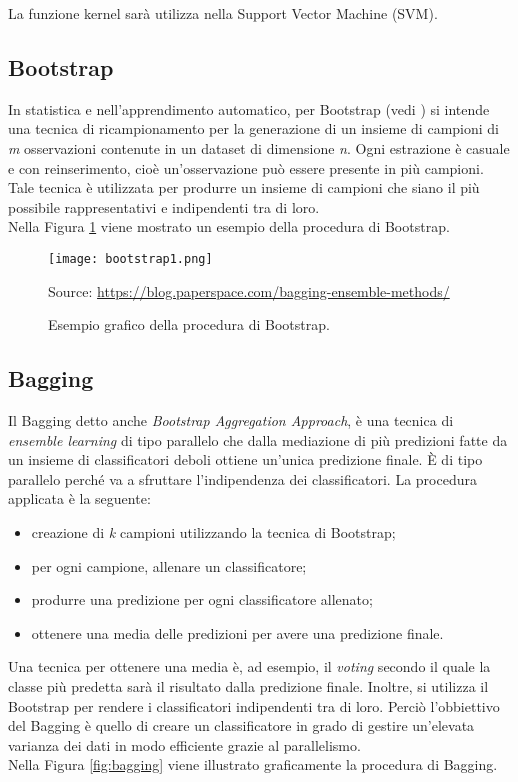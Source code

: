 La funzione kernel sarà utilizza nella Support Vector Machine (SVM).

\subsection{Bootstrap}
In statistica e nell'apprendimento automatico, per Bootstrap (vedi \textit{\cite{bootstrap}}) si intende una tecnica di ricampionamento per la generazione di un insieme di campioni di \emph{m} osservazioni contenute in un dataset di dimensione \emph{n}. Ogni estrazione è casuale e con reinserimento, cioè un’osservazione può essere presente in più campioni. Tale tecnica è utilizzata per produrre un insieme di campioni che siano il più possibile rappresentativi e indipendenti tra di loro.\\
Nella Figura \ref{fig:bootstrap} viene mostrato un esempio della procedura di Bootstrap.

\begin{figure}[h]
	\begin{center}
		\texttt{[image: bootstrap1.png]}
		\caption{Esempio grafico della procedura di Bootstrap.
		} 
		Source: \url{https://blog.paperspace.com/bagging-ensemble-methods/}\label{fig:bootstrap}
	\end{center}
\end{figure}

\subsection{Bagging}
Il Bagging \autocite{breiman1996bagging} detto anche \emph{Bootstrap Aggregation Approach}, è una tecnica di \emph{ensemble learning} di tipo parallelo che dalla mediazione di più predizioni fatte da un insieme di classificatori deboli ottiene un'unica predizione finale. È di tipo parallelo perché va a sfruttare l'indipendenza dei classificatori. La procedura applicata è la seguente:
\begin{itemize}
	\item creazione di \emph{k} campioni utilizzando la tecnica di Bootstrap;
	\item per ogni campione, allenare un classificatore;
	\item produrre una predizione per ogni classificatore allenato;
	\item ottenere una media delle predizioni per avere una predizione finale.
\end{itemize} 
Una tecnica per ottenere una media è, ad esempio, il \emph{voting} secondo il quale la classe più predetta sarà il risultato dalla predizione finale. Inoltre, si utilizza il Bootstrap per rendere i classificatori indipendenti tra di loro.
Perciò l'obbiettivo del Bagging è quello di creare un classificatore in grado di gestire un'elevata varianza dei dati in modo efficiente grazie al parallelismo.\\
Nella Figura \ref{fig:bagging} viene illustrato graficamente la procedura di Bagging.

